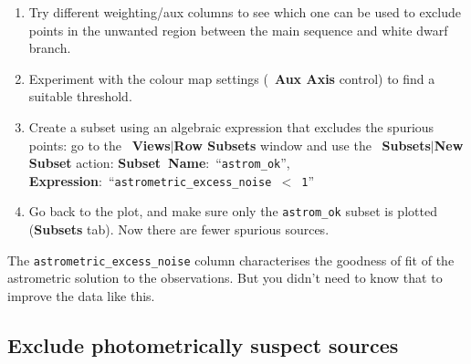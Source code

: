 \documentclass{article}
\newcommand{\buttimg}[1]
           {\mbox{\vtop{\vskip-2ex\hbox{\texttt{[image: \#1]}}}}}
\newcommand{\lab}[1]{{\bf #1}}
\newcommand{\ma}[2]{\buttimg{#1}~\lab{#2}}
\newcommand{\mb}[3]{\buttimg{#1}~\lab{#2}$\mid$\lab{#3}}
\newcommand{\entry}[2]{\lab{#1}: ``{\tt #2}''}
\begin{document}
\begin{enumerate}
\item Try different weighting/aux columns to see which one can be used
      to exclude points in the unwanted region between the main
      sequence and white dwarf branch.
\item Experiment with the colour map settings
      (\ma{colours2.png}{Aux Axis} control)
      to find a suitable threshold.
\item Create a subset using an algebraic expression that excludes
      the spurious points:
      go to the \mb{subsets_button.png}{Views}{Row Subsets} window
      and use the \mb{plus_button.png}{Subsets}{New Subset} action: 
      \mbox{\entry{Subset Name}{astrom\_ok}},
      \mbox{\entry{Expression}{astrometric\_excess\_noise $<$ 1}}
\item Go back to the plot, and make sure only the {\tt astrom\_ok}
      subset is plotted (\lab{Subsets} tab).
      Now there are fewer spurious sources.
\end{enumerate}
The {\tt astrometric\_excess\_noise} column characterises the
goodness of fit of the astrometric solution to the observations.
But you didn't need to know that to improve the data like this.

\subsection{Exclude photometrically suspect sources}
\label{sec:hrd-photom}
\end{document}
